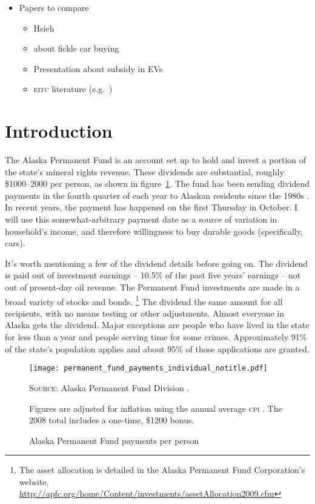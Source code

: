 \documentclass[11pt,letterpaper,oneside]{article}
\newcommand{\eitc}{\textsc{eitc}}
\begin{document}
\begin{itemize}
    \item Papers to compare
    \begin{itemize}
        \item Hsieh
        \item \textcite{Busse2015_weather_on_cars} about fickle car buying
        \item Presentation about subsidy in EVs
        \item \eitc{} literature (e.g.\ \cite{goodman2008eitc})
    \end{itemize}
\end{itemize}

\pagebreak
\setcounter{page}{1}
\section{Introduction}


The Alaska Permanent Fund is an account set up to hold and invest a portion of the state's mineral rights revenue.
These dividends are substantial, roughly \$1000--2000 per person, as shown in figure~\ref{fig:permanent-fund-payments-individual}.
The fund has been sending dividend payments in the fourth quarter of each year to Alaskan residents since the 1980s \parencite{hsieh2003}.
In recent years, the payment has happened on the first Thursday in October.
I will use this somewhat-arbitrary payment date as a source of variation in household's income, and therefore willingness to buy durable goods (specifically, cars).



It's worth mentioning a few of the dividend details before going on.
The dividend is paid out of investment earnings -- 10.5\% of the past five years' earnings -- not out of present-day oil revenue.
The Permanent Fund investments are made in a broad variety of stocks and bonds.%
\footnote{The asset allocation is detailed in the Alaska Permanent Fund Corporation's website, \url{http://apfc.org/home/Content/investments/assetAllocation2009.cfm}}
The dividend the same amount for all recipients, with no means testing or other adjustments.
Almost everyone in Alaska gets the dividend.
Major exceptions are people who have lived in the state for less than a year and people serving time for some crimes.
Approximately 91\% of the state's population applies and about 95\% of those applications are granted.

\begin{figure}[bht]
    \caption{\large Alaska Permanent Fund payments per person}
    \texttt{[image: permanent\_fund\_payments\_individual\_notitle.pdf]}
    \label{fig:permanent-fund-payments-individual}

\noindent\textsc{Source:} Alaska Permanent Fund Division \parencite{apfd_payments_summary}.\par
		Figures are adjusted for inflation using the annual average \textsc{cpi} \parencite{fred_inflation}.
		The 2008 total includes a one-time, \$1200 bonus.
\end{figure}
\end{document}
